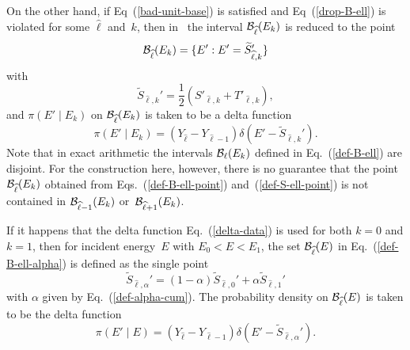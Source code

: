 {On the other hand, if Eq~(\ref{bad-unit-base})
is satisfied and Eq~(\ref{drop-B-ell}) is violated for some
$\widehat \ell$ and~$k$, then in \gettransfer\ the interval
${\cal B}_{\widehat \ell}(E_k)$ is reduced to the point
\begin{equation}
   {\cal B}_{\widehat \ell}(E_k) = \{E' : E' = \widetilde S_{\widehat \ell,k}' \} 
  \label{def-B-ell-point}
\end{equation}
with
\begin{equation}
    \widetilde S_{\widehat \ell,k}' =
     \frac{ 1} {2} \left(
    S'_{ \widehat \ell,k} + T'_{ \widehat \ell,k}
  \right),
  \label{def-S-ell-point}
\end{equation}
and $\pi( E' \mid E_k )$ on ${\cal B}_{\widehat \ell}(E_k)$ is taken
to be a delta function
\begin{equation}
  \pi( E' \mid E_k ) = \left(
    Y_{\widehat \ell} - Y_{\widehat \ell - 1}
   \right)
  \delta( E' - \widetilde S_{\widehat \ell,k}'  ).
 \label{delta-data}
\end{equation}
Note that in exact arithmetic the intervals ${\cal B}_{\ell}( E_k )$ defined
in Eq.~(\ref{def-B-ell}) are disjoint.  For the construction here,
however, there is no guarantee that the point ${\cal B}_{\widehat \ell}(E_k)$
obtained from Eqs.~(\ref{def-B-ell-point}) and~(\ref{def-S-ell-point})
is not contained in ${\cal B}_{\widehat \ell - 1}( E_k )$ or~${\cal B}_{\widehat \ell + 1}( E_k )$.

If it happens that the delta function Eq.~(\ref{delta-data}) is used
for both $k = 0$ and $k = 1$, then for incident energy~$E$ with
$E_0 < E < E_1$, the set  ${\cal B}_{\widehat \ell}(E)$ in
Eq.~(\ref{def-B-ell-alpha}) is defined as the single point
$$
  \widetilde S_{\widehat \ell, \alpha}' = ( 1 - \alpha ) \widetilde S_{\widehat \ell, 0}' +
  \alpha \widetilde S_{\widehat \ell,1}'
$$
with $\alpha$ given by Eq.~(\ref{def-alpha-cum}).  The
probability density on ${\cal B}_{\widehat \ell}(E)$ is taken to be
the delta function
$$
   \pi( E' \mid E ) = \left(
    Y_{\widehat \ell} - Y_{\widehat \ell - 1}
   \right)
  \delta( E' - \widetilde S_{\widehat \ell, \alpha}'  ).
$$

}
